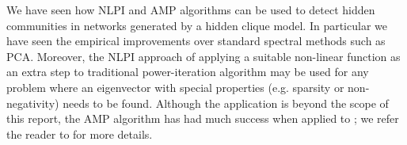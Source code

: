 We have seen how NLPI and AMP algorithms can be used to detect hidden communities in networks generated by a hidden clique model.
In particular we have seen the empirical improvements over standard spectral methods such as PCA.
Moreover, the NLPI approach of applying a suitable non-linear function as an extra step to traditional power-iteration algorithm may be used for any problem where an eigenvector with special properties (e.g. sparsity or non-negativity) needs to be found.
Although the application is beyond the scope of this report, the AMP algorithm has had much success when applied to ; we refer the reader to \cite{DMM09,MDM10,BM11,Mon11,BKS13} for more details. 